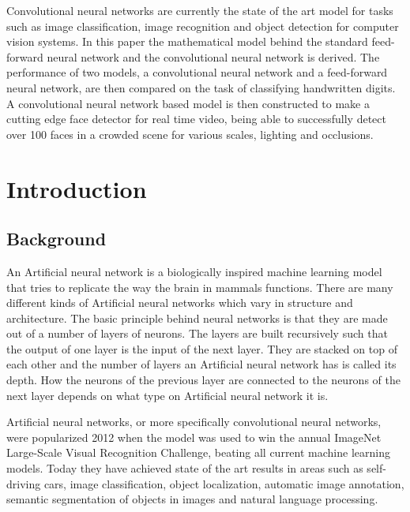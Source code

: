 \documentclass[a4paper,11pt,twoside]{article}
\begin{document}
Convolutional neural networks are currently the state of the art model for tasks such as image classification, image recognition and object detection for computer vision systems. In this paper the mathematical model behind the standard feed-forward neural network and the convolutional neural network is derived. The performance of two models, a convolutional neural network and a feed-forward neural network, are then compared on the task of classifying handwritten digits. A convolutional neural network based model is then constructed to make a cutting edge face detector for real time video, being able to successfully detect over 100 faces in a crowded scene for various scales, lighting and occlusions.
\newpage

\tableofcontents

\section{Introduction}

\subsection{Background}

An Artificial neural network is a biologically inspired machine learning model that tries to replicate the way the brain in mammals functions. There are many different kinds of Artificial neural networks which vary in structure and architecture. The basic principle behind neural networks is that they are made out of a number of layers of neurons. The layers are built recursively such that the output of one layer is the input of the next layer. They are stacked on top of each other and the number of layers an Artificial neural network has is called its depth. How the neurons of the previous layer are connected to the neurons of the next layer depends on what type on Artificial neural network it is.
\cite{cs231n}

Artificial neural networks, or more specifically convolutional neural networks, were popularized 2012 when the model was used to win the annual ImageNet Large-Scale Visual Recognition Challenge, beating all current machine learning models. Today they have achieved state of the art results in areas such as self-driving cars, image classification, object localization, automatic image annotation, semantic segmentation of objects in images and natural language processing. 
\cite{cs231n}
\end{document}
